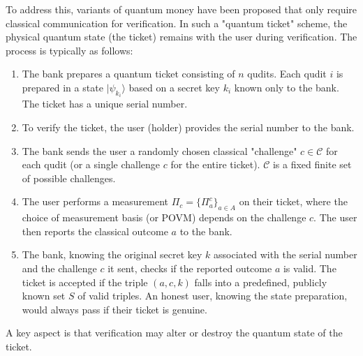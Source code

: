 \documentclass{article} %
\begin{document}
To address this, variants of quantum money have been proposed that only require classical communication for verification. In such a "quantum ticket" scheme, the physical quantum state (the ticket) remains with the user during verification.
The process is typically as follows:
\begin{enumerate}
    \item The bank prepares a quantum ticket consisting of $n$ qudits. Each qudit $i$ is prepared in a state $|\psi_{k_i}\rangle$ based on a secret key $k_i$ known only to the bank. The ticket has a unique serial number.
    \item To verify the ticket, the user (holder) provides the serial number to the bank.
    \item The bank sends the user a randomly chosen classical "challenge" $c \in \mathcal{C}$ for each qudit (or a single challenge $c$ for the entire ticket). $\mathcal{C}$ is a fixed finite set of possible challenges.
    \item The user performs a measurement $\Pi_c = \{\Pi_a^c\}_{a \in A}$ on their ticket, where the choice of measurement basis (or POVM) depends on the challenge $c$. The user then reports the classical outcome $a$ to the bank.
    \item The bank, knowing the original secret key $k$ associated with the serial number and the challenge $c$ it sent, checks if the reported outcome $a$ is valid. The ticket is accepted if the triple $(a, c, k)$ falls into a predefined, publicly known set $S$ of valid triples. An honest user, knowing the state preparation, would always pass if their ticket is genuine.
\end{enumerate}
A key aspect is that verification may alter or destroy the quantum state of the ticket.
\end{document}
